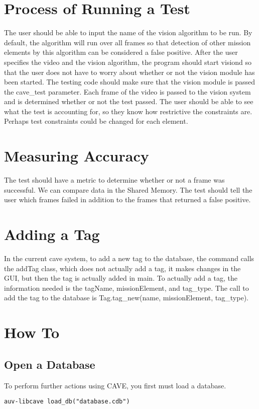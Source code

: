 \section{Process of Running a Test}
The user should be able to input the name of the vision algorithm to be run.  By default, the algorithm will run over all frames so that detection of other mission elements by this algorithm can be considered a false positive.  After the user specifies the video and the vision algorithm, the program should start visiond so that the user does not have to worry about whether or not the vision module has been started.  The testing code should make sure that the vision module is passed the cave\_test parameter.  Each frame of the video is passed to the vision system and is determined whether or not the test passed.  The user should be able to see what the test is accounting for, so they know how restrictive the constraints are.  Perhaps test constraints could be changed for each element.
\section{Measuring Accuracy}
The test should have a metric to determine whether or not a frame was successful.  We can compare data in the Shared Memory.  The test should tell the user which frames failed in addition to the frames that returned a false positive.
\section{Adding a Tag}

In the current cave system, to add a new tag to the database, the command calls the addTag class, which does not actually add a tag, it makes changes in the GUI, but then the tag is actually added in main.  To actually add a tag, the information needed is the tagName, missionElement, and tag\_type.  The call to add the tag to the database is Tag.tag\_new(name, missionElement, tag\_type).
\section{How To}
\subsection{Open a Database}
To perform further actions using CAVE, you first must load a database.
\begin{lstlisting}
auv-libcave load_db("database.cdb")
\end{lstlisting}

